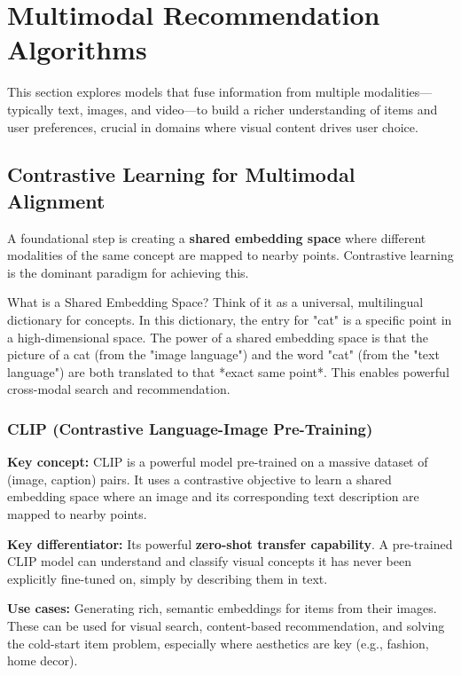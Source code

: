 \documentclass{article}
\begin{document}
    \section{Multimodal Recommendation Algorithms}
    This section explores models that fuse information from multiple modalities—typically text, images, and video—to build a richer understanding of items and user preferences, crucial in domains where visual content drives user choice.
    
    \subsection{Contrastive Learning for Multimodal Alignment}
    A foundational step is creating a \textbf{shared embedding space} where different modalities of the same concept are mapped to nearby points. Contrastive learning is the dominant paradigm for achieving this.
    
    \begin{asidebox}{What is a Shared Embedding Space?}
    Think of it as a universal, multilingual dictionary for concepts. In this dictionary, the entry for "cat" is a specific point in a high-dimensional space. The power of a shared embedding space is that the picture of a cat (from the "image language") and the word "cat" (from the "text language") are both translated to that *exact same point*. This enables powerful cross-modal search and recommendation.
    \end{asidebox}

    \subsubsection{CLIP (Contrastive Language-Image Pre-Training)}
\noindent\textbf{Key concept:} CLIP is a powerful model pre-trained on a massive dataset of (image, caption) pairs. It uses a contrastive objective to learn a shared embedding space where an image and its corresponding text description are mapped to nearby points.

\noindent\textbf{Key differentiator:} Its powerful \textbf{zero-shot transfer capability}. A pre-trained CLIP model can understand and classify visual concepts it has never been explicitly fine-tuned on, simply by describing them in text.

\noindent\textbf{Use cases:} Generating rich, semantic embeddings for items from their images. These can be used for visual search, content-based recommendation, and solving the cold-start item problem, especially where aesthetics are key (e.g., fashion, home decor).
\end{document}
